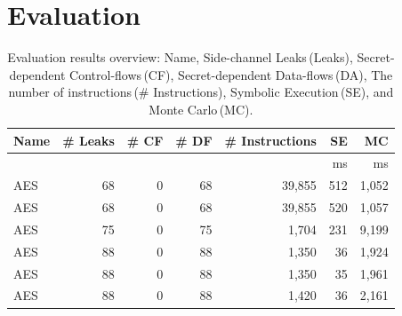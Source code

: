 \section{Evaluation}
\label{res_overview}

\begin{table}[h]
    \centering\small\footnotesize
    \caption{Evaluation results overview: Name, Side-channel Leaks\,(Leaks), 
        Secret-dependent Control-flows\,(CF), Secret-dependent Data-flows\,(DA),
        The number of instructions\,(\# Instructions), Symbolic Execution\,(SE), and Monte Carlo\,(MC).
    }\label{table:over_result}
    \vspace*{-5pt}
    \newlength{\x}
    \newlength{\y}
    \settowidth{\x}{~~}
    \settowidth{\y}{m}
    \addtolength{\x}{-1\y}
    \newcommand{\foo}{\mbox{\hspace*{\the\x}}}
    \begin{threeparttable}
    \begin{tabular}{l@{}r@{~~}rrr@{~~}rr}
        \hline
        \textbf{Name}   & \textbf{\# Leaks} & \textbf{\# CF}         & \textbf{\# DF}
                           & \textbf{\# Instructions}    & \textbf{SE} & \textbf{MC}                                                    \\\hline
                                                 &                        &                     &                      &              & ms        & ms              \\\cline{6-7}
        AES\tnote{1}               & 68                     & 0                   & 68                   & 39,855        & 512     & 1,052         \\
        AES\tnote{2}                & 68                     & 0                   & 68                   & 39,855       & 520    & 1,057         \\
        AES\tnote{4}                & 75                     & 0                   & 75                   & 1,704        & 231    & 9,199        \\
        AES\tnote{5}                & 88                     & 0                   & 88                   & 1,350        & 36      & 1,924         \\
        AES\tnote{6}                & 88                     & 0                   & 88                   & 1,350        & 35      & 1,961        \\
        AES\tnote{7}                & 88                     & 0                   & 88                   & 1,420        & 36     & 2,161        \\

\end{tabular}
\end{threeparttable}
\end{table}
